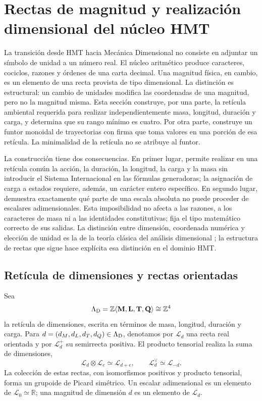 
\chapter{Rectas de magnitud y realización dimensional del núcleo HMT}
\label{chap:funtor-dimensional-hmt}

La transición desde HMT hacia Mecánica Dimensional no consiste en adjuntar
un símbolo de unidad a un número real. El núcleo aritmético produce
caracteres, cociclos, razones y órdenes de una carta decimal. Una magnitud
física, en cambio, es un elemento de una recta provista de tipo dimensional.
La distinción es estructural: un cambio de unidades modifica las coordenadas
de una magnitud, pero no la magnitud misma. Esta sección construye, por una
parte, la retícula ambiental requerida para realizar independientemente
masa, longitud, duración y carga, y determina que su rango mínimo es cuatro.
Por otra parte, construye un funtor monoidal de trayectorias con firma que
toma valores en una porción de esa retícula. La minimalidad de la retícula no
se atribuye al funtor.

La construcción tiene dos consecuencias. En primer lugar, permite realizar
en una retícula común la acción, la duración, la longitud, la carga y la masa
sin introducir el Sistema Internacional en las fórmulas generadoras; la
asignación de carga a estados requiere, además, un carácter entero
específico. En segundo lugar, demuestra exactamente qué parte de una escala
absoluta no puede proceder de escalares adimensionales. Esta imposibilidad no
afecta a las razones, a los caracteres de masa ni a las identidades
constitutivas; fija el tipo matemático correcto de sus salidas.
La distinción entre dimensión, coordenada numérica y elección de unidad es la
de la teoría clásica del análisis dimensional \cite{Buckingham1914,Bridgman1931};
la estructura de rectas que sigue hace explícita esa distinción en el dominio
HMT\@.

\section{Retícula de dimensiones y rectas orientadas}

Sea
\[
 \Lambda_{\rm D}
 =\mathbb Z\langle \mathbf M,\mathbf L,\mathbf T,\mathbf Q\rangle
 \cong\mathbb Z^4
\]
la retícula de dimensiones, escrita en términos de masa, longitud, duración
y carga. Para
\(d=(d_M,d_L,d_T,d_Q)\in\Lambda_{\rm D}\), denotamos por
\(\mathcal L_d\) una recta real orientada y por
\(\mathcal L_d^+\) su semirrecta positiva. El producto tensorial realiza la
suma de dimensiones,
\[
 \mathcal L_d\otimes\mathcal L_e\simeq\mathcal L_{d+e},
 \qquad
 \mathcal L_d^\vee\simeq\mathcal L_{-d}.
\]
La colección de estas rectas, con isomorfismos positivos y producto
tensorial, forma un grupoide de Picard simétrico. Un escalar adimensional es
un elemento de \(\mathcal L_0\simeq\mathbb R\); una magnitud de dimensión
\(d\) es un elemento de \(\mathcal L_d\).


